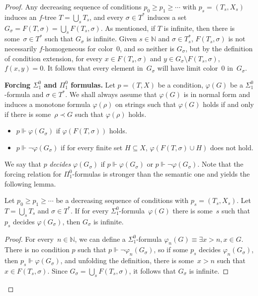 \documentclass[10pt,a4paper]{amsart}
\newcommand{\NN}[0]{\mathbb{N}}
\begin{document}
\begin{proof}
Any decreasing sequence of conditions $p_0 \geq p_1 \geq \cdots$ with $p_s = (T_s, X_s)$ induces an $f$-tree $T = \bigcup_s T_s$, and every $\sigma \in T^*$ induces a set $G_\sigma = F(T, \sigma) = \bigcup_s F(T_s, \sigma)$. As mentioned, if $T$ is infinite, then there is some~$\sigma \in T^*$ such that $G_\sigma$ is infinite.
Given $s \in \NN$ and $\sigma \in T_s^*$, $F(T_s, \sigma)$ is not necessarily $f$-homogeneous for color~0, and so neither is $G_\sigma$, but by the definition of condition extension, for every $x \in F(T_s, \sigma)$ and $y \in G_\sigma \setminus F(T_s, \sigma)$, $f(x, y) = 0$. It follows that every element in~$G_\sigma$ will have limit color~0 in~$G_\sigma$.
\bigskip

\noindent
\textbf{Forcing $\Sigma^0_1$ and $\Pi^0_1$ formulas.}
Let $p = (T, X)$ be a condition, $\varphi(G)$ be a $\Sigma^0_1$-formula and $\sigma \in T^*$. We shall always assume that $\varphi(G)$ is in normal form and induces a monotone formula $\varphi(\rho)$ on strings such that $\varphi(G)$ holds if and only if there is some~$\rho \prec G$ such that $\varphi(\rho)$ holds.
\begin{itemize}
    \item[(1)] $p \Vdash \varphi(G_\sigma)$ if $\varphi(F(T, \sigma))$ holds.
    \item[(2)] $p \Vdash \neg \varphi(G_\sigma)$ if for every finite set $H \subseteq X$, $\varphi(F(T, \sigma) \cup H)$ does not hold.
\end{itemize}
We say that $p$ \emph{decides} $\varphi(G_\sigma)$ if $p \Vdash \varphi(G_\sigma)$ or $p \Vdash \neg\varphi(G_\sigma)$. Note that the forcing relation for $\Pi^0_1$-formulas is stronger than the semantic one and yields the following lemma.

\begin{lemma}
Let $p_0 \geq p_1 \geq \cdots$ be a decreasing sequence of conditions with $p_s = (T_s, X_s)$.
Let $T = \bigcup_s T_s$ and $\sigma \in T^*$. If for every $\Sigma^0_1$-formula~$\varphi(G)$ there is some~$s$ such that $p_s$ decides $\varphi(G_\sigma)$, then $G_\sigma$ is infinite.
\end{lemma}
\begin{proof}
For every~$n \in \NN$, we can define a $\Sigma^0_1$-formula $\varphi_n(G) \equiv \exists x > n, x \in G$. There is no condition $p$ such that $p \Vdash \neg \varphi_n(G_\sigma)$, so if some $p_s$ decides $\varphi_n(G_\sigma)$, then $p_s \Vdash \varphi(G_\sigma)$, and unfolding the definition, there is some~$x > n$ such that $x \in F(T_s, \sigma)$.
Since $G_\sigma = \bigcup_s F(T_s, \sigma)$, it follows that $G_\sigma$ is infinite.
\end{proof}
\bigskip


\end{proof}
\end{document}
